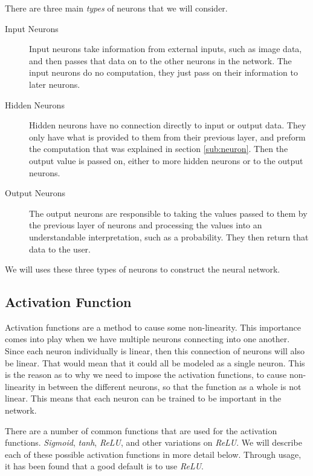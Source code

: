 \documentclass[10pt]{amsart}
\begin{document}
\begin{multicols}{2}
  There are three main \textit{types} of neurons that we will consider.
  \begin{description}
    \item[Input Neurons] Input neurons take information from external inputs,
      such as image data, and then passes that data on to the other neurons in
      the network. The input neurons do no computation, they just pass on their
      information to later neurons.
    \item[Hidden Neurons] Hidden neurons have no connection directly to input
      or output data. They only have what is provided to them from their
      previous layer, and preform the computation that was explained in section
      \ref{sub:neuron}. Then the output value is passed on, either to more
      hidden neurons or to the output neurons.
    \item[Output Neurons] The output neurons are responsible to taking the
      values passed to them by the previous layer of neurons and processing the
      values into an understandable interpretation, such as a probability. They
      then return that data to the user.
  \end{description}
  We will uses these three types of neurons to construct the neural network.

  \subsection{Activation Function}%
  \label{sub:activation_function}

  Activation functions are a method to cause some non-linearity. This
  importance comes into play when we have multiple neurons connecting into one
  another. Since each neuron individually is linear, then this connection of
  neurons will also be linear. That would mean that it could all be modeled as a
  single neuron. This is the reason as to why we need to impose the activation
  functions, to cause non-linearity in between the different neurons, so that
  the function as a whole is not linear. This means that each neuron can be
  trained to be important in the network.

  There are a number of common functions that are used for the activation
  functions. \textit{Sigmoid}, \textit{tanh}, \textit{ReLU}, and other
  variations on \textit{ReLU}. We will describe each of these possible
  activation functions in more detail below. Through usage, it has been found
  that a good default is to use \textit{ReLU}.


\end{multicols}
\end{document}
